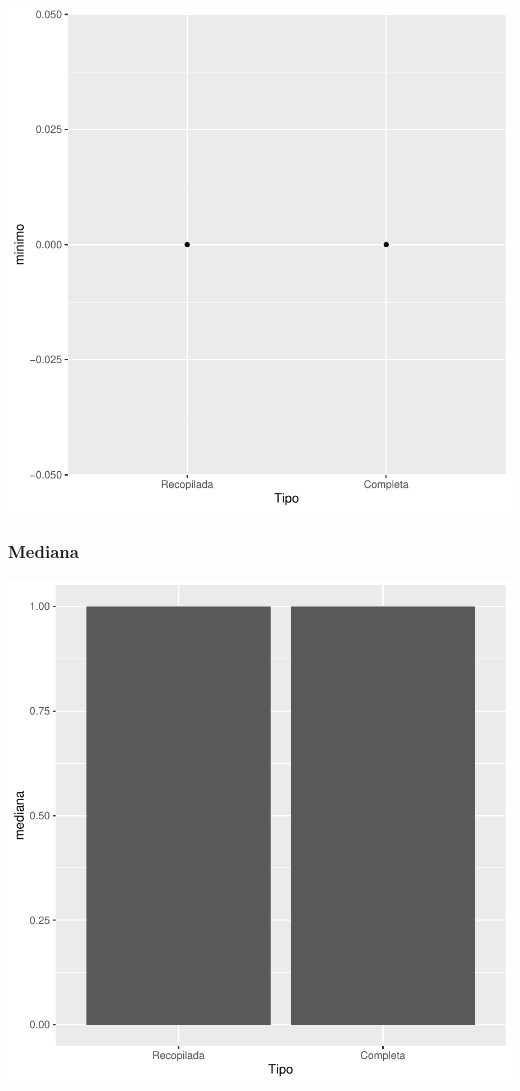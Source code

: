 \documentclass{article}
\begin{document}
\includegraphics{seguimento2-057}

\subsubsection{Mediana}

\includegraphics{seguimento2-058}
\end{document}
